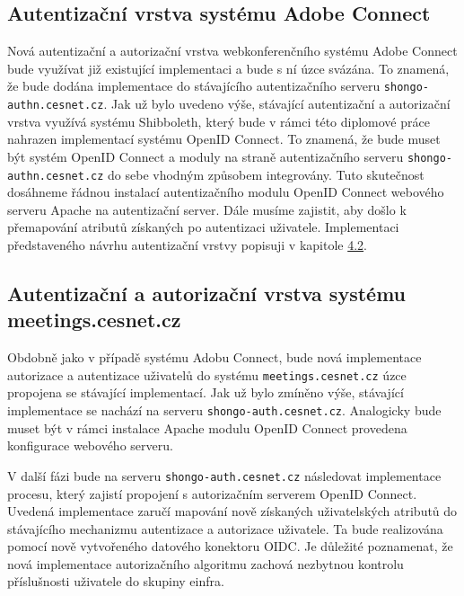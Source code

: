 \documentclass[
  printed, %
  twoside, %
  table,   %
  nolof,     %
  nolot,     %
]{fithesis3}
\begin{document}
\subsection{Autentizační vrstva systému Adobe Connect}
Nová autentizační a autorizační vrstva webkonferenčního systému Adobe Connect bude využívat již existující implementaci a bude s ní úzce svázána. To znamená, že bude dodána implementace do stávajícího autentizačního serveru \texttt{shongo-authn.cesnet.cz}. Jak už bylo uvedeno výše, stávající autentizační a autorizační vrstva využívá systému Shibboleth, který bude v rámci této diplomové práce nahrazen implementací systému OpenID Connect. To znamená, že bude muset být systém OpenID Connect a moduly na straně autentizačního serveru \texttt{shongo-authn.cesnet.cz} do sebe vhodným způsobem integrovány. Tuto skutečnost dosáhneme řádnou instalací autentizačního modulu OpenID Connect webového serveru Apache na autentizační server. Dále musíme zajistit, aby došlo k přemapování atributů získaných po autentizaci uživatele. Implementaci představeného návrhu autentizační vrstvy popisuji v kapitole \hyperref[ACImpl]{4.2}. 

\subsection{Autentizační a autorizační vrstva systému meetings.cesnet.cz}
Obdobně jako v případě systému Adobu Connect, bude nová implementace autorizace a autentizace uživatelů do systému \texttt{meetings.cesnet.cz} úzce propojena se stávající implementací. Jak už bylo zmíněno výše, stávající implementace se nachází na serveru \texttt{shongo-auth.cesnet.cz}. Analogicky bude muset být v rámci instalace Apache modulu OpenID Connect provedena konfigurace webového serveru. \par
V další fázi bude na serveru \texttt{shongo-auth.cesnet.cz} následovat implementace procesu, který zajistí propojení s autorizačním serverem OpenID Connect. Uvedená implementace zaručí mapování nově získaných uživatelských atributů do stávajícího mechanizmu autentizace a autorizace uživatele. Ta bude realizována pomocí nově vytvořeného datového konektoru OIDC. Je důležité poznamenat, že nová implementace autorizačního algoritmu zachová nezbytnou kontrolu příslušnosti uživatele do skupiny einfra. 
\par
\end{document}
